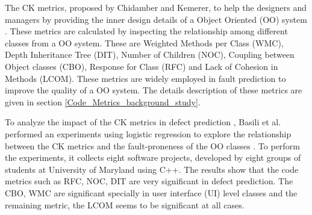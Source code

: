 \documentclass[12pt]{report}
\begin{document}

The CK metrics, proposed by Chidamber and Kemerer, to help the designers and managers by providing the inner design details of a Object Oriented (OO) system \cite{chidamber1994metrics}. These metrics are calculated by inspecting the relationship among different classes from a OO system. These are Weighted Methods per Class (WMC), Depth Inheritance Tree (DIT), Number of Children (NOC), Coupling between Object classes (CBO), Response for Class (RFC) and Lack of Cohesion in Methods (LCOM). These metrics are widely employed in fault prediction to improve the quality of a OO system. The details description of these metrics are given in section \ref{Code_Metrics_background_study}. 

To analyze the impact of the CK metrics in defect prediction \cite{chidamber1994metrics}, Basili et al. performed an experiments using logistic regression to explore the relationship between the CK metrics and the fault-proneness of the OO classes \cite{basili1996validation}. To perform the experiments, it collects eight software projects, developed by eight groups of students at University of Maryland using C++. The results show that the code metrics such as RFC, NOC, DIT are very significant in defect prediction. The CBO, WMC are significant specially in user interface (UI) level classes and the remaining metric, the LCOM seems to be significant at all cases.


\end{document}
